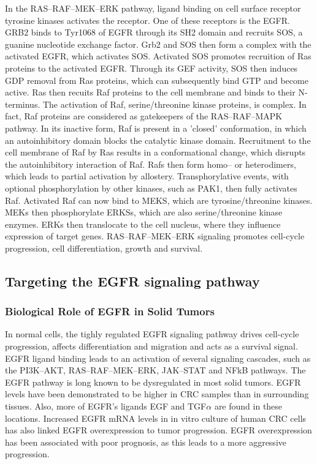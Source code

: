 {{{      In the RAS--RAF--MEK--ERK pathway, ligand binding on cell surface receptor
      tyrosine kinases activates the receptor. One of these receptors is the
      EGFR. GRB2 binds to Tyr1068 of EGFR through its SH2 domain
      and recruits SOS, a guanine nucleotide exchange factor. Grb2 and SOS then
      form a complex with the activated EGFR, which activates SOS. Activated SOS
      promotes recruition of Ras proteins to the activated EGFR. Through its GEF
      activity, SOS then induces GDP removal from Ras proteins, which can
      subsequently bind GTP and become active. Ras then recuits Raf proteins to
      the cell membrane and binds to their N-terminus. The activation of Raf,
      serine/threonine kinase proteins, is complex. In fact, Raf proteins are
      considered as gatekeepers of the RAS--RAF--MAPK pathway. In its inactive
      form, Raf is present in a 'closed' conformation, in which an
      autoinhibitory domain blocks the catalytic kinase domain. Recruitment to
      the cell membrane of Raf by Ras results in a conformational change, which
      disrupts the autoinhibitory interaction of Raf. Rafs then form homo-- or
      heterodimers, which leads to partial activation by allostery.
      Transphorylative events, with optional phosphorylation by other kinases,
      such as PAK1, then fully activates Raf. Activated Raf can now bind to
      MEKS, which are tyrosine/threonine kinases. MEKs then phosphorylate ERKSs,
      which are also serine/threonine kinase enzymes. ERKs then translocate to
      the cell nucleus, where they influence expression of target genes.
      RAS--RAF--MEK--ERK signaling promotes cell-cycle progression, cell
      differentiation, growth and survival.

  \subsection{Targeting the EGFR signaling pathway}


    \subsubsection{Biological Role of EGFR in Solid Tumors}

      In normal cells, the tighly regulated EGFR signaling pathway drives
      cell-cycle progression, affects differentiation and migration and  acts as
      a survival signal. EGFR ligand binding leads to an activation of several
      signaling cascades, such as the PI3K--AKT, RAS--RAF--MEK--ERK, JAK--STAT
      and NFkB pathways. The EGFR pathway is long known to be dysregulated in
      most solid tumors. EGFR levels have been demonstrated to be higher in CRC
      samples than in surrounding tissues. Also, more of EGFR's ligands EGF and
      TGF$\alpha$ are found in these locations. Increased EGFR mRNA levels in in
      vitro culture of human CRC cells  has also linked EGFR overexpression to
      tumor progression. EGFR overexpression has been associated with poor
      prognosis, as this leads to a more aggressive progression.

}}}

